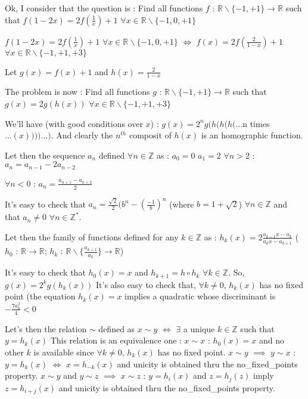 \begin{solution}
	Ok, I consider that the question is :
Find all functions $ f$ : $ \mathbb R\backslash\{ - 1, + 1\}\to\mathbb R$ such that $ f(1 - 2x) = 2f(\frac {1}{x}) + 1$ $ \forall x\in\mathbb R\backslash\{ - 1,0, + 1\}$


$ f(1 - 2x) = 2f(\frac {1}{x}) + 1$ $ \forall x\in\mathbb R\backslash\{ - 1,0, + 1\}$ $ \Leftrightarrow$ $ f(x) = 2f(\frac {2}{1 - x}) + 1$ $ \forall x\in\mathbb R\backslash\{ - 1, + 1, + 3\}$

Let $ g(x) = f(x) + 1$ and $ h(x) = \frac {2}{1 - x}$

The problem is now : Find all functions $ g$ : $ \mathbb R\backslash\{ - 1, + 1\}\to\mathbb R$ such that $ g(x) = 2g(h(x))$  $ \forall x\in\mathbb R\backslash\{ - 1, + 1, + 3\}$

We'll have (with good conditions over $ x$) : $ g(x) = 2^ng(h(h(h( ...$n times$ ...(x)))) ... )$. And clearly the $ n^{th}$ composit of $ h(x)$ is an homographic function.

Let then the sequence $ a_n$ defined $ \forall n\in\mathbb Z$ as :
$ a_0 = 0$
$ a_1 = 2$
$ \forall n > 2$ : $ a_n = a_{n - 1} - 2a_{n - 2}$

$ \forall n < 0$ : $ a_n = \frac {a_{n + 1} - a_{n + 2}}{2}$

It's easy to check that $ a_n = \frac {\sqrt 2}{2}(b^n - (\frac { - 1}{b})^n$ (where $ b = 1 + \sqrt 2$) $ \forall n\in\mathbb Z$ and that $ a_n\neq 0$ $ \forall n\in\mathbb Z^*$.

Let then the family of functions defined for any ${ k\in\mathbb Z}$ as : $ h_k(x) = 2\frac {a_{k - 1}x - a_k}{a_kx - a_{k + 1}}$ ($ h_0$ : $ \mathbb R\to \mathbb R$; $ h_k$ : $ \mathbb R\backslash\{\frac {a_{k + 1}}{a_k}\}\to\mathbb R$)

It's easy to check that $ h_0(x) = x$ and $ h_{k + 1} = h\circ h_k$ $ \forall k\in\mathbb Z$. So, $ g(x) = 2^kg(h_k(x))$
It's also easy to check that, $ \forall k\neq 0$, $ h_k(x)$ has no fixed point (the equation $ h_k(x) = x$ implies a quadratic whose discriminant is $ - \frac {7a_k^2}{4} < 0$

Let's then the relation $ \sim$ defined as $ x\sim y$ $ \iff$ $ \exists$ a unique $ k\in \mathbb Z$ such that $ y = h_k(x)$
This relation is an equivalence one :
$ x\sim x$ : $ h_0(x) = x$ and no other $ k$ is available since $ \forall k\neq 0$, $ h_k(x)$ has no fixed point.
$ x\sim y$ $ \implies$ $ y\sim x$ : $ y = h_k(x)$ $ \iff$ $ x = h_{ - k}(x)$ and unicity is obtained thru the no_fixed_points property.
$ x\sim y$ and $ y\sim z$ $ \implies$ $ x\sim z$ :  $ y = h_i(x)$ and $ z = h_j(z)$ imply $ z = h_{i + j}(x)$ and unicity is obtained thru the no_fixed_points property.


\end{solution}
